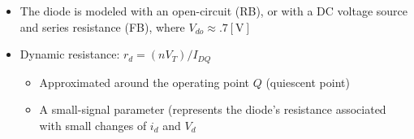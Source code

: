 \begin{itemize}
\begin{itemize}
        \begin{itemize}

          \item The diode is modeled with an open-circuit (RB), or with a DC voltage source and series resistance (FB), where $V_{do}\approx .7[\si{\volt}]$

          \item Dynamic resistance: $r_d=(nV_T)/I_{DQ}$

            \begin{itemize}

              \item Approximated around the operating point $Q$ (quiescent point)

              \item A small-signal parameter (represents the diode's resistance associated with small changes of $i_d$ and $V_d$

            \end{itemize}

        \end{itemize}

    \end{itemize}

\end{itemize}



